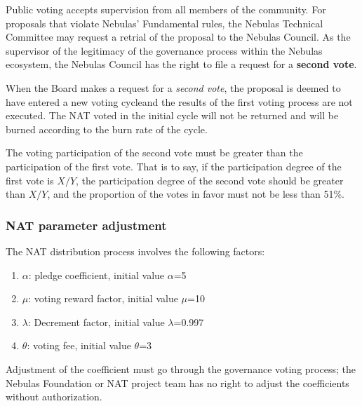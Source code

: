 Public voting accepts supervision from all members of the community. For proposals that violate Nebulas' Fundamental rules, the Nebulas Technical Committee may request a retrial of the proposal to the Nebulas Council. As the supervisor of the legitimacy of the governance process within the Nebulas ecosystem, the Nebulas Council has the right to file a request for a \textbf{second vote}.

When the Board makes a request for a \emph{second vote}, the proposal is deemed to have entered a new voting cycleand the results of the first voting process are not executed. The NAT voted in the initial cycle will not be returned and will be burned according to the burn rate of the cycle.

The voting participation of the second vote must be greater than the
participation of the first vote. That is to say, if the participation degree of
the first vote is $X/Y$, the participation degree of the second vote should be
greater than $X/Y$, and the proportion of the votes in favor must not be less than 51\%.

\subsubsection{NAT parameter adjustment}

The NAT distribution process involves the following factors:

\begin{enumerate}
	\item $\alpha$: pledge coefficient, initial value $\alpha$=5
	\item $\mu$: voting reward factor, initial value $\mu$=10
	\item $\lambda$: Decrement factor, initial value $\lambda$=0.997
	\item $\theta$: voting fee, initial value $\theta$=3
\end{enumerate}

Adjustment of the coefficient must go through the governance voting process; the Nebulas Foundation or NAT project team has no right to adjust the coefficients without authorization.
